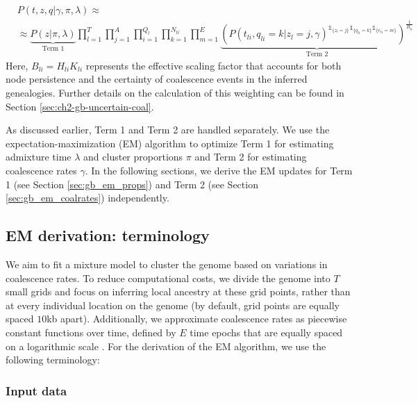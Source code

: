 \begingroup
\footnotesize
\begin{align}
    &P(t,z,q \vert \gamma, \pi, \lambda) \approx \nonumber \\
    & \approx \underbrace{P(z \vert \pi, \lambda)}_{\text{Term 1}} \prod_{l =1}^{T} \prod_{j = 1}^A \prod_{i=1}^{Q_l} \prod_{k =1}^{N_{li}} \prod_{m = 1}^E \underbrace{\left( P(t_{li},q_{li}=k \vert z_{l} = j, \gamma)^{\mathds{1}_{\{z_{l} = j\}} \mathds{1}_{\{q_{li} = k\}} \mathds{1}_{\{e_{li} = m\}}} \right) ^{\frac{1}{B_{li}}}}_{\text{Term 2}}
\label{eq:term1_term2}
\end{align}
\endgroup
Here, \( B_{li} = H_{li}K_{li} \) represents the effective scaling factor that accounts for both node persistence and the certainty of coalescence events in the inferred genealogies. Further details on the calculation of this weighting can be found in Section \ref{sec:ch2-gb-uncertain-coal}. 

As discussed earlier, Term 1 and Term 2 are handled separately. We use the expectation-maximization (EM) algorithm to optimize Term 1 for estimating admixture time \( \lambda \) and cluster proportions \( \pi \) and Term 2 for estimating coalescence rates \( \gamma \). In the following sections, we derive the EM updates for Term 1 (see Section \ref{sec:gb_em_props}) and Term 2 (see Section \ref{sec:gb_em_coalrates}) independently.

\subsection{EM derivation: terminology}
\label{terminology}
We aim to fit a mixture model to cluster the genome based on variations in coalescence rates. To reduce computational costs, we divide the genome into $T$ small grids and focus on inferring local ancestry at these grid points, rather than at every individual location on the genome (by default, grid points are equally spaced $10$kb apart). Additionally, we approximate coalescence rates as piecewise constant functions over time, defined by $E$ time epochs that are equally spaced on a logarithmic scale \cite{schiffels2014inferring}. For the derivation of the EM algorithm, we use the following terminology:

\subsubsection{Input data}

